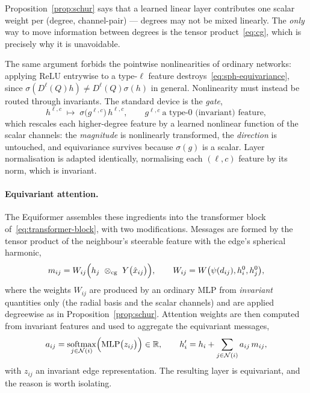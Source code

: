 \documentclass[a4paper,12pt]{article}
\theoremstyle{remark}
\DeclareMathOperator{\softmax}{softmax}
\DeclareMathOperator{\MLP}{MLP}
\begin{document}
Proposition~\ref{prop:schur} says that a learned linear layer contributes one scalar
weight per (degree, channel-pair) --- degrees may not be mixed linearly. The \emph{only}
way to move information between degrees is the tensor product~\eqref{eq:cg}, which is
precisely why it is unavoidable.

The same argument forbids the pointwise nonlinearities of ordinary networks: applying
$\mathrm{ReLU}$ entrywise to a type-$\ell$ feature destroys~\eqref{eq:sph-equivariance},
since $\sigma(D^\ell(Q)h)\neq D^\ell(Q)\sigma(h)$ in general. Nonlinearity must instead
be routed through invariants. The standard device is the \emph{gate},
\begin{equation}
\label{eq:gate}
h^{\ell,c}
\;\longmapsto\;
\sigma\!\bigl(g^{\ell,c}\bigr)\,h^{\ell,c},
\qquad
g^{\ell,c}\ \text{a type-$0$ (invariant) feature},
\end{equation}
which rescales each higher-degree feature by a learned nonlinear function of the scalar
channels: the \emph{magnitude} is nonlinearly transformed, the \emph{direction} is
untouched, and equivariance survives because $\sigma(g)$ is a scalar. Layer
normalisation is adapted identically, normalising each $(\ell,c)$ feature by its norm,
which is invariant.

\paragraph{Equivariant attention.}
The Equiformer assembles these ingredients into the transformer block
of~\eqref{eq:transformer-block}, with two modifications. Messages are formed by the
tensor product of the neighbour's steerable feature with the edge's spherical harmonic,
\begin{equation}
\label{eq:equiv-message}
m_{ij}
=
W_{ij}\Bigl(h_j\ \otimes_{\mathrm{cg}}\ Y\bigl(\hat x_{ij}\bigr)\Bigr),
\qquad
W_{ij}=W\bigl(\psi(d_{ij}),h_i^{0},h_j^{0}\bigr),
\end{equation}
where the weights $W_{ij}$ are produced by an ordinary MLP from \emph{invariant}
quantities only (the radial basis and the scalar channels) and are applied degreewise as
in Proposition~\ref{prop:schur}. Attention weights are then computed from invariant
features and used to aggregate the equivariant messages,
\begin{equation}
\label{eq:equiv-attention}
a_{ij}=\softmax_{j\in\mathcal N(i)}\Bigl(\MLP\bigl(z_{ij}\bigr)\Bigr)\in\mathbb R,
\qquad
h_i'
=
h_i+\sum_{j\in\mathcal N(i)}a_{ij}\,m_{ij},
\end{equation}
with $z_{ij}$ an invariant edge representation. The resulting layer is equivariant, and
the reason is worth isolating.
\end{document}
